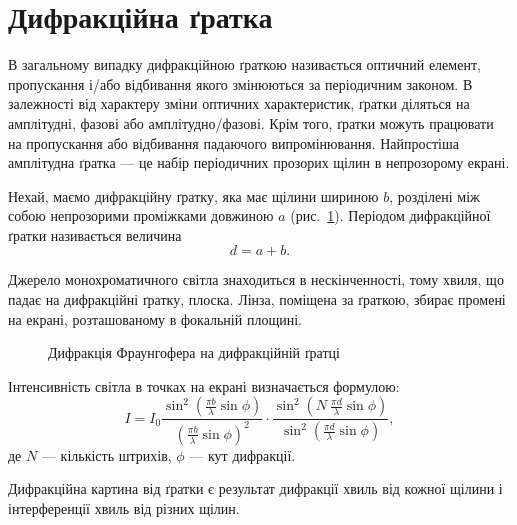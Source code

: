 





\section{Дифракційна ґратка}

В загальному випадку дифракційною ґраткою називається оптичний елемент, пропускання і/або відбивання якого змінюються за періодичним законом. В залежності від характеру зміни оптичних характеристик, ґратки діляться на амплітудні, фазові або амплітудно/фазові. Крім того, ґратки можуть працювати на пропускання або відбивання падаючого випромінювання. Найпростіша амплітудна ґратка --- це набір періодичних прозорих щілин в непрозорому екрані.

Нехай, маємо дифракційну ґратку, яка має щілини шириною $b$, розділені між собою непрозорими проміжками довжиною $a$ (рис.~\ref{pic:slots}). Періодом дифракційної ґратки називається величина
\begin{equation*}
    d = a + b.
\end{equation*}


Джерело монохроматичного світла знаходиться в нескінченності, тому хвиля, що падає на дифракційні ґратку, плоска. Лінза, поміщена за ґраткою, збирає промені на екрані, розташованому в фокальній площині.

\begin{figure}[hb!]\centering
    
    \caption{Дифракція Фраунгофера на дифракційній ґратці}
    \label{pic:slots}
\end{figure}


Інтенсивність світла в точках на екрані визначається формулою:
\begin{equation}\label{eq:Difraction_I_slots}
    I = I_0 \frac{\sin^2\left( {\frac{\pi b}{\lambda} \sin\phi}\right)}{\left( \frac{\pi b}{\lambda} \sin\phi\right)^2} \cdot
    \frac{\sin^2\left( {N\ \frac{\pi d}{\lambda} \sin\phi}\right)}{\sin^2\left( \frac{\pi d}{\lambda} \sin\phi\right)},
\end{equation}
де $N$ --- кількість штрихів, $\phi$ --- кут дифракції.

Дифракційна картина від ґратки є результат дифракції хвиль від кожної щілини і інтерференції хвиль від різних щілин.

